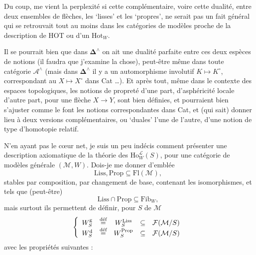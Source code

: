 Du coup, me vient la perplexité si cette complémentaire, voire cette dualité, entre deux ensembles de flèches, les `lisses' et les `propres', ne serait pas un fait général qui se retrouvait tout au moins dans les catégories de modèles proche de la description de HOT ou d'un $\mathrm{Hot}_W$.


Il se pourrait bien que dans $\boldsymbol{\Delta}^\wedge$ on ait une dualité parfaite entre ces deux espèces de notions (il faudra que j'examine la chose), peut-être même dans toute catégorie $\mathcal{A}^\wedge$ (mais dans $\boldsymbol{\Delta}^\wedge$ il y a un automorphisme involutif $K \longmapsto K^\circ$, correspondant au $X \longmapsto X^\circ$ dans Cat \dots). Et après tout, même dans le contexte des espaces topologiques, les notions de propreté d'une part, d'asphéricité locale d'autre part, pour une flèche $X \longrightarrow Y$, sont bien définies, et pourraient bien s'ajuster comme le font les notions correspondantes dans Cat, et (qui sait) donner lieu à deux versions complémentaires, ou `duales' l'une de l'autre, d'une notion de type d'homotopie relatif.

N'en ayant pas le cœur net, je suis un peu indécis comment présenter une description axiomatique de la théorie des $\mathrm{Ho}^{\mathcal{L}}_W(S)$, pour une catégorie de modèles générale $(\mathcal{M},W)$. Dois-je me donner d'emblée
\[
\mathrm{Liss}, \mathrm{Prop} \subseteq \mathrm{Fl}(\mathcal{M}),
\]
stables par composition, par changement de base, contenant les isomorphismes, et tels que (peut-être)
\[
\mathrm{Liss} \cap \mathrm{Prop} \subseteq \mathrm{Fib}_W,
\]
mais surtout ils permettent de définir, pour $S$ de $\mathcal{M}$
\[
\left\{
\begin{array}{lcccl}
W^{\mathrm{g}}_S & \deff & W^{\mathrm{Liss}}_S & \subseteq & \mathcal{F}(\mathcal{M}/S)\\
W^{\mathrm{d}}_S & \deff & W^{\mathrm{Prop}}_S & \subseteq & \mathcal{F}(\mathcal{M}/S)
\end{array}
\right.
\]
avec les propriétés suivantes :


